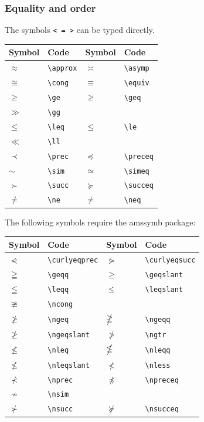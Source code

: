 \documentclass[a4paper,14pt]{extarticle}
\begin{document}
\subsubsection{Equality and order}

The symbols \verb-< = >- can be typed directly.  

\begin{center}
\begin{tabular}{|p{}p{}|p{}p{}|}
\hline
Symbol & Code & Symbol & Code \\
\hline
\(\approx\) & \verb=\approx= & \(\asymp\) & \verb=\asymp= \\
\(\cong\) & \verb=\cong= & \(\equiv\) & \verb=\equiv= \\ 
\(\ge\) & \verb=\ge= & \(\geq\) & \verb=\geq= \\
\(\gg\) & \verb=\gg= & & \\
\(\leq\) & \verb=\leq= & \(\le\) & \verb=\le= \\
\(\ll\) & \verb=\ll= && \\
\(\prec\) & \verb=\prec= & \(\preceq\) & \verb=\preceq= \\
\(\sim\) & \verb=\sim= & \(\simeq\) & \verb=\simeq= \\
\(\succ\) & \verb=\succ= & \(\succeq\) & \verb=\succeq= \\
\hline
\(\ne\) & \verb=\ne= & \(\neq\) & \verb=\neq= \\
\hline
\end{tabular}
\end{center}

The following symbols require the amssymb package:
\begin{center}
\begin{tabular}{|p{}p{}|p{}p{}|}
\hline
Symbol & Code & Symbol & Code \\
\hline
\(\curlyeqprec\) & \verb=\curlyeqprec= & \(\curlyeqsucc\) & \verb=\curlyeqsucc= \\
\(\geqq\) & \verb=\geqq= & \(\geqslant\) & \verb=\geqslant= \\
\(\leqq\) & \verb=\leqq= & \(\leqslant\) & \verb=\leqslant= \\
\hline
\(\ncong\) & \verb=\ncong= & & \\
\(\ngeq\) & \verb=\ngeq= & \(\ngeqq\) & \verb=\ngeqq= \\
\(\ngeqslant\) & \verb=\ngeqslant= & \(\ngtr\) & \verb=\ngtr= \\
\(\nleq\) & \verb=\nleq= & \(\nleqq\) & \verb=\nleqq= \\
\(\nleqslant\) & \verb=\nleqslant= & \(\nless\) & \verb=\nless= \\
\(\nprec\) & \verb=\nprec= & \(\npreceq\) & \verb=\npreceq= \\
\(\nsim\) & \verb=\nsim= & & \\
\(\nsucc\) & \verb=\nsucc= & \(\nsucceq\) & \verb=\nsucceq= \\
\hline
\end{tabular}
\end{center}
\end{document}
